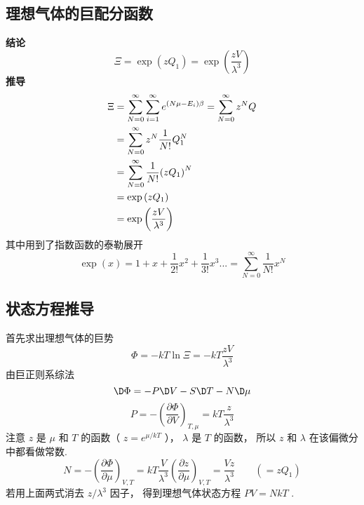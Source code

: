 
\subsection{理想气体的巨配分函数}
\noindent\textbf{结论}
  \begin{equation}\label{IdMCE_eq1}
    \Xi  = \exp \left( {z{Q_1}} \right) = \exp \left( {\frac{{zV}}{{{\lambda ^3}}}} \right)
  \end{equation}
  \textbf{推导}
  \begin{equation}\label{IdMCE_eq2}
    \begin{aligned}
\Xi & = \sum\limits_{N = 0}^\infty  {\sum\limits_{i = 1}^\infty  {{e^{\left( {N\mu  - {E_i}} \right)\beta }}} }  = \sum\limits_{N = 0}^\infty  {{z^N}Q} \\
 & = \sum\limits_{N = 0}^\infty  {{z^N}\frac{1}{{N!}}Q_1^N} \\
 & = \sum\limits_{N = 0}^\infty  {\frac{1}{{N!}}{{\left( {z{Q_1}} \right)}^N}} \\
 & = \exp \left( {z{Q_1}} \right) \\
 & = \exp \left( {\frac{{zV}}{{{\lambda ^3}}}} \right){\kern 1pt} {\kern 1pt} {\kern 1pt} {\kern 1pt} {\kern 1pt} {\kern 1pt} {\kern 1pt}
\end{aligned}
  \end{equation}
  其中用到了指数函数的泰勒展开%
  \begin{equation}\label{IdMCE_eq3}
  \exp \left( x \right) = 1 + x + \frac{1}{{2!}}{x^2} + \frac{1}{{3!}}{x^3}... = \sum\limits_{N = 0}^\infty  {\frac{1}{{N!}}{x^N}}
  \end{equation}

\subsection{状态方程推导}
  首先求出理想气体的巨势
  \begin{equation}\label{IdMCE_eq4}
    \Phi  =  - kT\ln \Xi  =  - kT\frac{{zV}}{{{\lambda ^3}}}
  \end{equation}
  由巨正则系综法%
  \begin{equation}\label{IdMCE_eq5}
    \D \Phi  =  - P \D V - S \D T - N \D \mu
  \end{equation}
  \begin{equation}\label{IdMCE_eq6}
    P =  - {\left( {\frac{{\partial \Phi }}{{\partial V}}} \right)_{T,\mu }} = kT\frac{z}{{{\lambda ^3}}}
  \end{equation}
  注意 $z$ 是 $\mu $ 和 $T$ 的函数（ $z = {e^{{\mu }/{{kT}}}}$ ）， $\lambda $ 是 $T$ 的函数， 所以 $z$ 和 $\lambda $ 在该偏微分中都看做常数.
  \begin{equation}\label{IdMCE_eq7}
  N =  - {\left( {\frac{{\partial \Phi }}{{\partial \mu }}} \right)_{V,T}} = kT\frac{V}{{{\lambda ^3}}}{\left( {\frac{{\partial z}}{{\partial \mu }}} \right)_{V,T}} = \frac{{Vz}}{{{\lambda ^3}}} 
  \qquad
  ( = z{Q_1})
  \end{equation}
若用上面两式消去 ${z}/{{{\lambda ^3}}}$ 因子， 得到理想气体状态方程 $PV = NkT$ .
  
